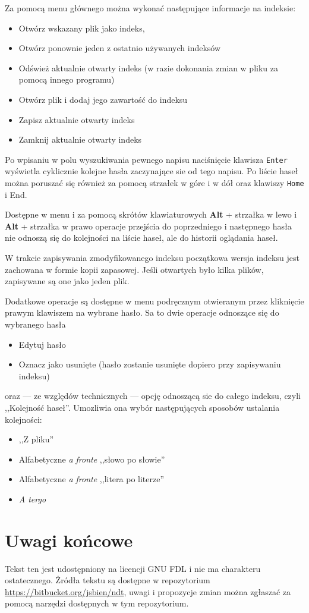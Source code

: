 \documentclass{mwart}
\def\key#1{\textbf{#1}}
\begin{document}
Za pomocą menu głównego można wykonać następujące informacje na
indeksie:
\begin{itemize}
\item Otwórz wskazany plik jako indeks,
\item Otwórz ponownie jeden z ostatnio używanych indeksów
\item Odśwież aktualnie otwarty indeks (w razie dokonania zmian w
  pliku za pomocą innego programu)
\item Otwórz plik i dodaj jego zawartość do indeksu
\item Zapisz aktualnie otwarty indeks
\item Zamknij aktualnie otwarty indeks
\end{itemize} 

Po wpisaniu w polu wyszukiwania pewnego napisu naciśnięcie klawisza
\texttt{Enter} wyświetla cyklicznie kolejne hasła zaczynające sie od
tego napisu. Po liście haseł można poruszać się również za pomocą
strzałek w góre i w dół oraz klawiszy \texttt{Home} i \textup{End}.

Dostępne w menu i za pomocą skrótów klawiaturowych \key{Alt} +
strzałka w lewo i \key{Alt} + strzałka w prawo operacje przejścia do
poprzedniego i następnego hasła nie odnoszą się do kolejności na
liście haseł, ale do historii oglądania haseł.

W trakcie zapisywania zmodyfikowanego indeksu początkowa wersja
indeksu jest zachowana w formie kopii zapasowej. Jeśli otwartych było
kilka plików, zapisywane są one jako jeden plik.

Dodatkowe operacje są dostępne w menu podręcznym otwieranym przez
kliknięcie prawym klawiszem na wybrane hasło. Sa to dwie operacje
odnoszące się do wybranego hasła
\begin{itemize}
\item Edytuj hasło
\item Oznacz jako usunięte (hasło zostanie usunięte dopiero przy
  zapisywaniu indeksu)
\end{itemize}
oraz --- ze względów technicznych --- opcję odnoszącą sie do całego
indeksu, czyli ,,Kolejność haseł''. Umozliwia ona wybór następujących
sposobów ustalania kolejności:
\begin{itemize}
\item ,,Z pliku''
\item  Alfabetyczne \textit{a fronte} ,,słowo po słowie''
\item Alfabetyczne \textit{a fronte} ,,litera po literze''
\item \textit{A tergo}
\end{itemize}


\section{Uwagi końcowe}
\label{sec:uwagi-kocowe}

Tekst ten jest udostępniony na licencji GNU FDL i nie ma charakteru
ostatecznego. Żródła tekstu są dostępne w repozytorium
\url{https://bitbucket.org/jsbien/ndt}, uwagi i propozycje zmian można
zgłaszać za pomocą narzędzi dostępnych w tym repozytorium.
\end{document}
